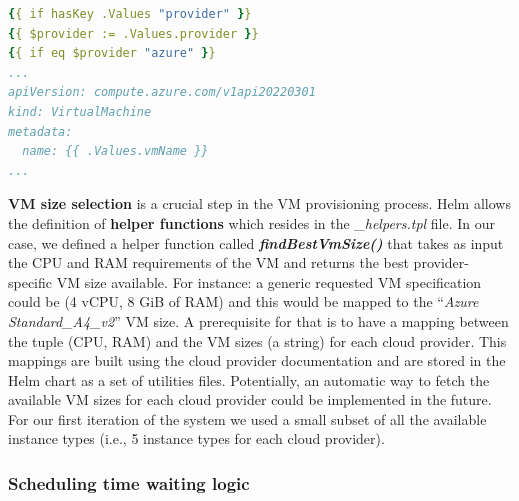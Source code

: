 \vspace{0.5cm}


\vspace{0.5cm}

\begin{lstlisting}[language=yaml, caption={Helm Template guards example}, label={lst:guards}]
{{ if hasKey .Values "provider" }}
{{ $provider := .Values.provider }}
{{ if eq $provider "azure" }}
...
apiVersion: compute.azure.com/v1api20220301
kind: VirtualMachine
metadata:
  name: {{ .Values.vmName }}
...
\end{lstlisting}


\textbf{VM size selection} is a crucial step in the VM provisioning process.
Helm allows the definition of \textbf{helper functions} which resides in the \textit{\_helpers.tpl} file.
In our case, we defined a helper function called \textbf{\textit{findBestVmSize()}} that takes as input the CPU and RAM requirements of the VM and returns the best provider-specific VM size available.
For instance: a generic requested VM specification could be (4 vCPU, 8 GiB of RAM) and this would be mapped to the ``\textit{Azure Standard\_A4\_v2}'' VM size.
A prerequisite for that is to have a mapping between the tuple (CPU, RAM) and the VM sizes (a string) for each cloud provider.
This mappings are built using the cloud provider documentation and are stored in the Helm chart as a set of utilities files.
Potentially, an automatic way to fetch the available VM sizes for each cloud provider could be implemented in the future.
For our first iteration of the system we used a small subset of all the available instance types (i.e., 5 instance types for each cloud provider).

\subsubsection{Scheduling time waiting logic}
\label{sec:scheduling_time_waiting_logic}

